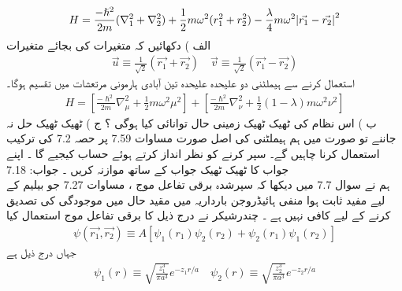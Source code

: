 \begin{align}
H=\frac{-\hslash^{2}}{2m}(\nabla_{1}^{2}+\nabla_{2}^{2})+\frac{1}{2}m\omega^{2}(r_{1}^{2}+r_{2}^{2})-\frac{\lambda}{4}m\omega^{2}\abs{\vec{r_{1}}-\vec{r_{2}}}^{2} 
\end{align}
 الف ) دکھائیں کہ متغیرات  کی بجائے متغیرات
\begin{align}
\vec{u}\equiv\frac{1}{\sqrt{2}}(\vec{r_{1}}+\vec{r_{2}})\quad \vec{v}\equiv\frac{1}{\sqrt{2}}(\vec{r_{1}}-\vec{r_{2}})
\end{align}
 استعمال کرنے سے ہیملٹنی دو علیحدہ علیحدہ تین آبادی ہارمونی  مرتعشات میں تقسیم ہوگا۔
\begin{align}
H=[\frac{-\hslash^{2}}{2m}\nabla_{\mu}^{2}+\frac{1}{2}m\omega^{2}\mu^{2}]+[\frac{-\hslash^{2}}{2m}\nabla_{\nu}^{2}+\frac{1}{2}(1-\lambda)m\omega^{2}\nu^{2}]
\end{align}
 ب ) اس نظام کی ٹھیک ٹھیک زمینی حال توانائی کیا ہوگی ؟
ج ) ٹھیک ٹھیک حل نہ جاننے تو صورت میں ہم ہیملٹنی کی اصل صورت مساوات 7.59 پر حصہ 7.2 کی ترکیب استعمال کرنا چاہیں گے۔
سپر کرنے کو نظر انداز کرتے ہوئے حساب کیجیے گا ۔ اپنے جواب کا ٹھیک ٹھیک جواب کے ساتھ موازنہ کریں ۔
جواب: 
7.18\\
ہم نے سوال 7.7 میں دیکھا کہ سپرشدہ برقی تفاعل موج ، مساوات 7.27 جو بیلیم کے لیے مفید ثابت ہوا منفی ہائیڈروجن بارداریہ میں مقید حال میں موجودگی کی تصدیق کرنے کے لیے کافی نہیں ہے ۔ چندرشیكر  نے درج ذیل کا برقی تفاعل موج استعمال کیا
\begin{align}
\psi(\vec{r_{1}},\vec{r_{2}})\equiv A[\psi_{1}(r_{1})\psi_{2}(r_{2})+\psi_{2}(r_{1})\psi_{1}(r_{2})]
\end{align}
 جہاں درج ذیل ہے
\begin{align}
\psi_{1}(r)\equiv \sqrt{\frac{z_{1}^{3}}{\pi a^{3}}}e^{-z_{1}r/a} \quad \psi_{2}(r)\equiv \sqrt{\frac{z_{2}^{3}}{\pi a^{3}}}e^{-z_{2}r/a} 
\end{align}
 
